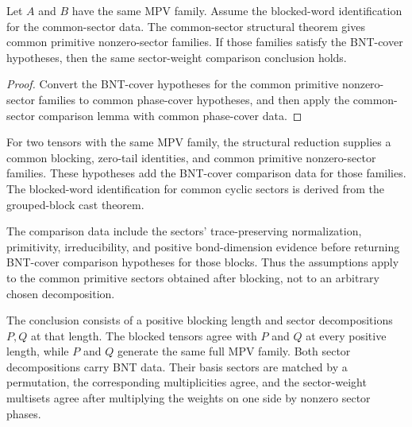 \begin{lemma}%
\label{lem:afterBlocking_sectorComparison_reindexed_bntCover}
	\leanok
	Let $A$ and $B$ have the same MPV family. Assume the blocked-word
	identification for the common-sector data.  The common-sector structural
	theorem gives common primitive nonzero-sector families. If those families
	satisfy the BNT-cover hypotheses, then the same sector-weight comparison
	conclusion holds.
\end{lemma}

\begin{proof}
	\leanok
	Convert the BNT-cover hypotheses for the common primitive nonzero-sector
	families to common phase-cover hypotheses, and then apply the common-sector
	comparison lemma with common phase-cover data.
\end{proof}

\begin{definition}%
	\label{def:after_blocking_fundamental_theorem_hypotheses}
	\leanok
	For two tensors with the same MPV family, the structural reduction supplies
	a common blocking, zero-tail identities, and common primitive nonzero-sector
	families. These hypotheses add the BNT-cover comparison data for those
	families. The blocked-word identification for common cyclic sectors is
	derived from the grouped-block cast theorem.

	The comparison data include the sectors'
	trace-preserving normalization, primitivity, irreducibility, and positive
	bond-dimension evidence before returning BNT-cover comparison hypotheses for
	those blocks. Thus the assumptions apply to the common primitive sectors
	obtained after blocking, not to an arbitrary chosen decomposition.
\end{definition}

\begin{definition}%
\label{def:after_blocking_fundamental_theorem_conclusion}
	\leanok
	The conclusion consists of a positive blocking length and sector
	decompositions $P,Q$ at that length. The blocked tensors agree with
	$P$ and $Q$ at every positive length, while $P$ and $Q$ generate the same
	full MPV family. Both sector decompositions carry BNT data. Their basis
	sectors are matched by a permutation, the corresponding multiplicities agree,
	and the sector-weight multisets agree after multiplying the weights on one
	side by nonzero sector phases.
\end{definition}

